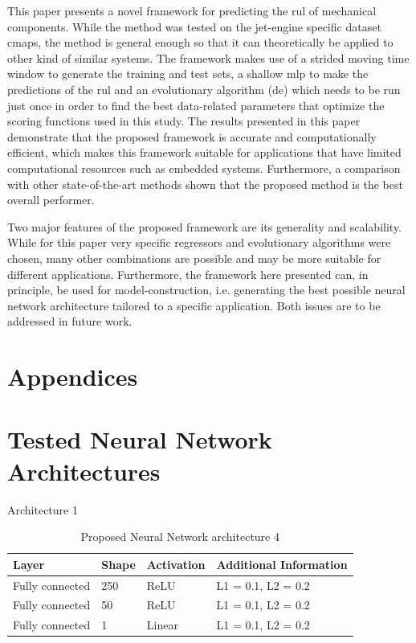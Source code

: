 \documentclass{article}
\begin{document}
This paper presents a novel framework for predicting the \gls{rul} of mechanical components. While the method was tested on the jet-engine specific dataset \gls{cmaps}, the method is general enough so that it can theoretically be applied to other kind of similar systems. The framework makes use of a strided moving time window to generate the training and test sets, a shallow \gls{mlp} to make the predictions of the \gls{rul} and an evolutionary algorithm (\gls{de}) which needs to be run just once in order to find the best data-related parameters that optimize the scoring functions used in this study.  The results presented in this paper demonstrate that the proposed framework is accurate and computationally efficient, which makes this framework suitable for applications that have limited computational resources such as embedded systems. Furthermore, a comparison with other state-of-the-art methods shown that the proposed method is the best overall performer. 

Two major features of the proposed framework are its generality and scalability. While for this paper very specific regressors and evolutionary algorithms were chosen, many other combinations are possible and may be more suitable for different applications. Furthermore, the framework here presented can, in principle, be used for model-construction, i.e. generating the best possible neural network architecture tailored to a specific application. Both issues are to be addressed in future work.


\pagebreak
\appendix
{}
\section*{Appendices}

\section{Tested Neural Network Architectures}
\label{sec:appendices}

Architecture 1

\begin{table}[!htb]
\centering
\begin{tabular}{l l l l}
	\hline
	Layer & Shape & Activation & Additional Information\\
  	\hline
  	Fully connected & 250 & ReLU & L1 = 0.1, L2 = 0.2\\
  	Fully connected & 50 & ReLU & L1 = 0.1, L2 = 0.2\\
  	Fully connected & 1 & Linear & L1 = 0.1, L2 = 0.2\\
  	\hline
\end{tabular}
\caption{Proposed Neural Network architecture 4}
\label{table:proposed_nn_4}
\end{table}
\end{document}
